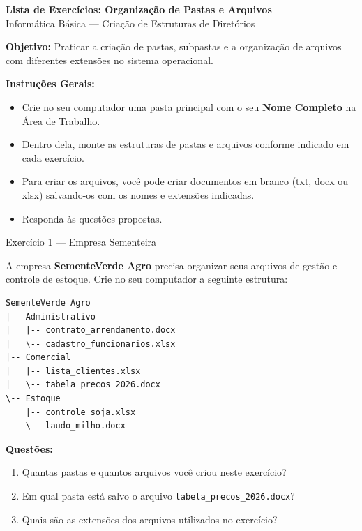 \documentclass[12pt]{article}
\begin{document}
    
    \vspace*{0.2cm}
    
\begin{center}
  {\Large \textbf{Lista de Exercícios: Organização de Pastas e Arquivos}}\\[0.2cm]
  {\normalsize Informática Básica --- Criação de Estruturas de Diretórios}
\end{center}

\vspace{0.4cm}

\textbf{Objetivo:} Praticar a criação de pastas, subpastas e a organização de arquivos com diferentes extensões no sistema operacional.

\textbf{Instruções Gerais:}
\begin{itemize}
    \item Crie no seu computador uma pasta principal com o seu \textbf{Nome Completo} na Área de Trabalho.
    \item Dentro dela, monte as estruturas de pastas e arquivos conforme indicado em cada exercício.
    \item Para criar os arquivos, você pode criar documentos em branco (txt, docx ou xlsx) salvando-os com os nomes e extensões indicadas.
    \item Responda às questões propostas.
\end{itemize}

\vspace{0.3cm}

\begin{block}{Exercício 1 --- Empresa Sementeira}

A empresa \textbf{SementeVerde Agro} precisa organizar seus arquivos de gestão e controle de estoque. Crie no seu computador a seguinte estrutura:

\begin{verbatim}
SementeVerde Agro
|-- Administrativo
|   |-- contrato_arrendamento.docx
|   \-- cadastro_funcionarios.xlsx
|-- Comercial
|   |-- lista_clientes.xlsx
|   \-- tabela_precos_2026.docx
\-- Estoque
    |-- controle_soja.xlsx
    \-- laudo_milho.docx
\end{verbatim}

\textbf{Questões:}
\begin{enumerate}[label=\alph*)]
    \item Quantas pastas e quantos arquivos você criou neste exercício?
    \item Em qual pasta está salvo o arquivo \texttt{tabela\_precos\_2026.docx}?
    \item Quais são as extensões dos arquivos utilizados no exercício?
\end{enumerate}

\end{block}
\end{document}
